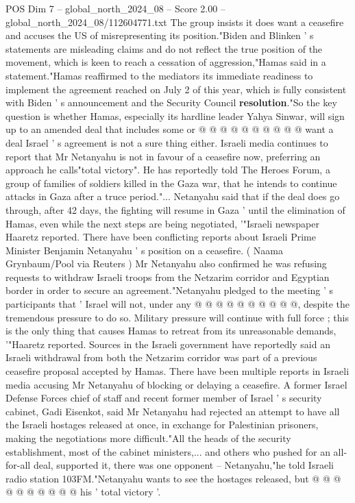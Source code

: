\begin{textsample}{POS Dim 7 – global\_north\_2024\_08 – Score 2.00 – global\_north\_2024\_08/112604771.txt}
The group insists it does want a ceasefire and accuses the US of misrepresenting its position."Biden and Blinken ' s statements are misleading claims and do not reflect the true position of the movement, which is keen to reach a cessation of aggression,"Hamas said in a statement."Hamas reaffirmed to the mediators its immediate readiness to implement the agreement reached on July 2 of this year, which is fully consistent with Biden ' s announcement and the Security Council \textbf{resolution}."So the key question is whether Hamas, especially its hardline leader Yahya Sinwar, will sign up to an amended deal that includes some or @ @ @ @ @ @ @ @ @ @ want a deal Israel ' s agreement is not a sure thing either.
Israeli media continues to report that Mr Netanyahu is not in favour of a ceasefire now, preferring an approach he calls"total victory".
He has reportedly told The Heroes Forum, a group of families of soldiers killed in the Gaza war, that he intends to continue attacks in Gaza after a truce period."...
Netanyahu said that if the deal does go through, after 42 days, the fighting will resume in Gaza ' until the elimination of Hamas, even while the next steps are being negotiated, '"Israeli newspaper Haaretz reported.
There have been conflicting reports about Israeli Prime Minister Benjamin Netanyahu ' s position on a ceasefire. ( Naama Grynbaum/Pool via Reuters ) Mr Netanyahu also confirmed he was refusing requests to withdraw Israeli troops from the Netzarim corridor and Egyptian border in order to secure an agreement."Netanyahu pledged to the meeting ' s participants that ' Israel will not, under any @ @ @ @ @ @ @ @ @ @, despite the tremendous pressure to do so.
Military pressure will continue with full force ; this is the only thing that causes Hamas to retreat from its unreasonable demands, '"Haaretz reported.
Sources in the Israeli government have reportedly said an Israeli withdrawal from both the Netzarim corridor was part of a previous ceasefire proposal accepted by Hamas.
There have been multiple reports in Israeli media accusing Mr Netanyahu of blocking or delaying a ceasefire.
A former Israel Defense Forces chief of staff and recent former member of Israel ' s security cabinet, Gadi Eisenkot, said Mr Netanyahu had rejected an attempt to have all the Israeli hostages released at once, in exchange for Palestinian prisoners, making the negotiations more difficult."All the heads of the security establishment, most of the cabinet ministers,... and others who pushed for an all-for-all deal, supported it, there was one opponent -- Netanyahu,"he told Israeli radio station 103FM."Netanyahu wants to see the hostages released, but @ @ @ @ @ @ @ @ @ @ his ' total victory '.

\end{textsample}
